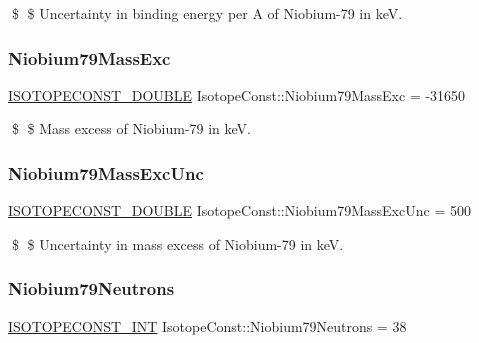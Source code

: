 \$ \$ Uncertainty in binding energy per A of Niobium-\/79 in keV. \mbox{\label{group___isotope_const-_niobium-_nb79_ga81aa6ff683a49b9888cd847b05026888}} 
\subsubsection{\texorpdfstring{Niobium79\+Mass\+Exc}{Niobium79MassExc}}
{\footnotesize\ttfamily \mbox{\hyperlink{group___isotope_const-_macros_ga8f45a7272ce02c0b4c65c44636ed719a}{I\+S\+O\+T\+O\+P\+E\+C\+O\+N\+S\+T\+\_\+\+D\+O\+U\+B\+LE}} Isotope\+Const\+::\+Niobium79\+Mass\+Exc = -\/31650}

\$ \$ Mass excess of Niobium-\/79 in keV. \mbox{\label{group___isotope_const-_niobium-_nb79_gab7d9df795f2ffe361579253ca6d7c9d0}} 
\subsubsection{\texorpdfstring{Niobium79\+Mass\+Exc\+Unc}{Niobium79MassExcUnc}}
{\footnotesize\ttfamily \mbox{\hyperlink{group___isotope_const-_macros_ga8f45a7272ce02c0b4c65c44636ed719a}{I\+S\+O\+T\+O\+P\+E\+C\+O\+N\+S\+T\+\_\+\+D\+O\+U\+B\+LE}} Isotope\+Const\+::\+Niobium79\+Mass\+Exc\+Unc = 500}

\$ \$ Uncertainty in mass excess of Niobium-\/79 in keV. \mbox{\label{group___isotope_const-_niobium-_nb79_gaa8871cfbd72289153baecaeb43094da3}} 
\subsubsection{\texorpdfstring{Niobium79\+Neutrons}{Niobium79Neutrons}}
{\footnotesize\ttfamily \mbox{\hyperlink{group___isotope_const-_macros_ga5f18360b3e99483a35c32d789e62621c}{I\+S\+O\+T\+O\+P\+E\+C\+O\+N\+S\+T\+\_\+\+I\+NT}} Isotope\+Const\+::\+Niobium79\+Neutrons = 38}

